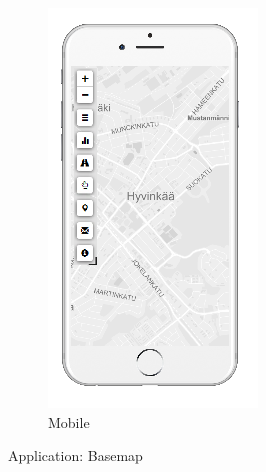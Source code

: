 \begin{figure}[ht]
\begin{subfigure}[b]{0.2\textwidth}
    \includegraphics[width=\textwidth]
      {img/c02-application/png/mobile-basemap.png}
    \caption{Mobile}
  \end{subfigure}
  \caption{Application: Basemap}
\end{figure}





